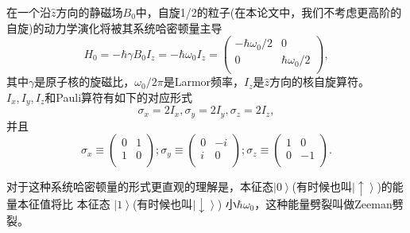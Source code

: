 在一个沿$\hat{z}$方向的静磁场$B_0$中，自旋1/2的粒子(在本论文中，我们不考虑更高阶的自旋)的动力学演化将被其系统哈密顿量主导
\begin{equation}\label{static}
 H_{0} = -\hbar \gamma B_0 I_z = -\hbar \omega_0 I_z = \left(
                                                         \begin{array}{cc}
                                                           -\hbar \omega_0/2 & 0 \\                                                           0& \hbar \omega_0/2 \\
                                                         \end{array}
                                                       \right),
\end{equation}
其中$\gamma$是原子核的旋磁比，$\omega_0/2 \pi$是Larmor频率，$I_z$是$\hat{z}$方向的核自旋算符。$I_x, I_y, I_z$和Pauli算符有如下的对应形式
\begin{equation}\label{static}
 \sigma_x = 2I_x,  \sigma_y = 2I_y,  \sigma_z = 2I_z ,
\end{equation}
并且
\begin{equation}\label{static}
 \sigma_x \equiv \left(
                   \begin{array}{cc}
                     0 & 1 \\
                     1 & 0 \\
                   \end{array}
                 \right);
  \sigma_y \equiv \left(
                   \begin{array}{cc}
                     0 & -i \\
                     i & 0 \\
                   \end{array}
                 \right);  \sigma_z \equiv \left(
                   \begin{array}{cc}
                     1 & 0 \\
                     0 & -1 \\
                   \end{array}
                 \right).
\end{equation}

对于这种系统哈密顿量的形式更直观的理解是，本征态$\left\vert  0 \right\rangle$(有时候也叫$\left\vert  \uparrow \right\rangle$)的能量本征值将比
本征态 $\left\vert  1 \right\rangle$(有时候也叫$\left\vert  \downarrow \right\rangle$) 小$\hbar \omega_0$，这种能量劈裂叫做Zeeman劈裂。

